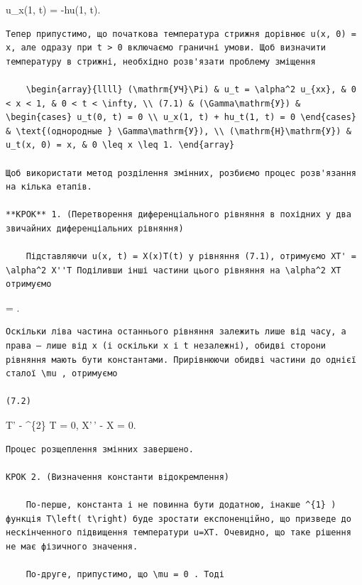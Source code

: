 \documentclass[
  ukrainian,
]{article}
\begin{document}
u\_x(1, t) = -hu(1, t).

\begin{verbatim}
Тепер припустимо, що початкова температура стрижня дорівнює u(x, 0) = x, але одразу при t > 0 включаємо граничні умови. Щоб визначити температуру в стрижні, необхідно розв'язати проблему зміщення

    \begin{array}{llll} (\mathrm{УЧ}\Pi) & u_t = \alpha^2 u_{xx}, & 0 < x < 1, & 0 < t < \infty, \\ (7.1) & (\Gamma\mathrm{У}) & \begin{cases} u_t(0, t) = 0 \\ u_x(1, t) + hu_t(1, t) = 0 \end{cases} & \text{(однородные } \Gamma\mathrm{У}), \\ (\mathrm{H}\mathrm{У}) & u_t(x, 0) = x, & 0 \leq x \leq 1. \end{array}

Щоб використати метод розділення змінних, розбиємо процес розв'язання на кілька етапів.

**КРОК** 1. (Перетворення диференціального рівняння в похідних у два звичайних диференціальних рівняння)

    Підставляючи u(x, t) = X(x)T(t) у рівняння (7.1), отримуємо XT' = \alpha^2 X''T Поділивши інші частини цього рівняння на \alpha^2 XT отримуємо
\end{verbatim}

 =  .

\begin{verbatim}
Оскільки ліва частина останнього рівняння залежить лише від часу, а права — лише від x (і оскільки x і t незалежні), обидві сторони рівняння мають бути константами. Прирівнюючи обидві частини до однієї сталої \mu , отримуємо

(7.2)
\end{verbatim}

T' - \mu \alpha\^{}\{2\} T = 0, X'\,' - \mu X = 0.

\begin{verbatim}
Процес розщеплення змінних завершено.

КРОК 2. (Визначення константи відокремлення)

    По-перше, константа і не повинна бути додатною, інакше ^{1} ) функція T\left( t\right) буде зростати експоненційно, що призведе до нескінченного підвищення температури u=XT. Очевидно, що таке рішення не має фізичного значення.

    По-друге, припустимо, що \mu = 0 . Тоді
\end{verbatim}
\end{document}
